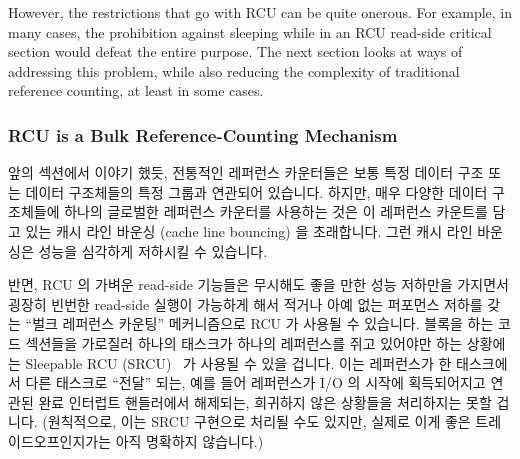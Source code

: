 However, the restrictions that go with RCU can be quite onerous.
For example, in many cases, the prohibition against sleeping while in an RCU
read-side critical section would defeat the entire purpose.
The next section looks at ways of addressing this problem, while also
reducing the complexity of traditional reference counting, at least in
some cases.
\fi

\subsubsection{RCU is a Bulk Reference-Counting Mechanism}
\label{sec:defer:RCU is a Bulk Reference-Counting Mechanism}

앞의 섹션에서 이야기 했듯, 전통적인 레퍼런스 카운터들은 보통 특정 데이터 구조
또는 데이터 구조체들의 특정 그룹과 연관되어 있습니다.
하지만, 매우 다양한 데이터 구조체들에 하나의 글로벌한 레퍼런스 카운터를
사용하는 것은 이 레퍼런스 카운트를 담고 있는 캐시 라인 바운싱 (cache line
bouncing) 을 초래합니다.
그런 캐시 라인 바운싱은 성능을 심각하게 저하시킬 수 있습니다.

반면, RCU 의 가벼운 read-side 기능들은 무시해도 좋을 만한 성능 저하만을
가지면서 굉장히 빈번한 read-side 실행이 가능하게 해서 적거나 아예 없는 퍼포먼스
저하를 갖는 ``벌크 레퍼런스 카운팅'' 메커니즘으로 RCU 가 사용될 수 있습니다.
블록을 하는 코드 섹션들을 가로질러 하나의 태스크가 하나의 레퍼런스를 쥐고
있어야만 하는 상황에는 Sleepable RCU (SRCU)~\cite{PaulEMcKenney2006c} 가 사용될
수 있을 겁니다.
이는 레퍼런스가 한 태스크에서 다른 태스크로 ``전달'' 되는, 예를 들어 레퍼런스가
I/O 의 시작에 획득되어지고 연관된 완료 인터럽트 핸들러에서 해제되는, 희귀하지
않은 상황들을 처리하지는 못할 겁니다.
(원칙적으로, 이는 SRCU 구현으로 처리될 수도 있지만, 실제로 이게 좋은
트레이드오프인지가는 아직 명확하지 않습니다.)

